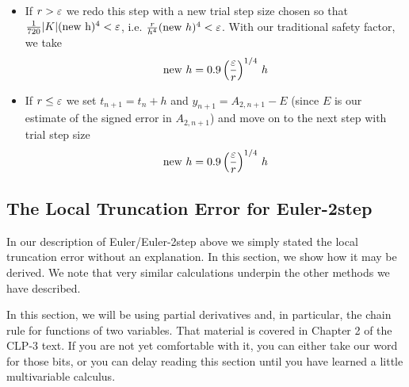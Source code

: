 \begin{itemize}
\item
If $r>\varepsilon$ we redo this step with a new trial step size chosen so that
$\frac{1}{720}|K|(\text{new h})^4<\varepsilon$, 
i.e. $\frac{r}{h^4}(\text{new }h)^4<\varepsilon$. 
With our traditional safety factor, we take
\begin{equation*}
\text{new }h=0.9\left(\frac{\varepsilon}{r}\right)^{1/4}\,h
\end{equation*}
\item
If $r\le \varepsilon$ we set $t_{n+1}=t_n+h$ and $y_{n+1}=A_{2,n+1}-E$ (since $E$ is
our estimate of the signed error in $A_{2,n+1}$) and move on to the next step with trial step size 
\begin{equation*}
\text{new }h=0.9\left(\frac{\varepsilon}{r}\right)^{1/4}\,h
\end{equation*}
\end{itemize}

\subsection{The Local Truncation Error for Euler-2step}

In our description of Euler/Euler-2step above we simply stated the local truncation error without an explanation. In this section, we show how it may be derived. We note that very similar calculations underpin the other methods we have described. 

In this section, we will be using partial derivatives and, in particular, the chain rule for functions of two variables. That material is covered in Chapter 2 of the CLP-3 text. If you are not yet comfortable with it, you can either take our word for those bits, or you can delay reading this section until you have learned a little multivariable calculus.  

